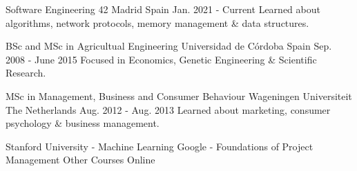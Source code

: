 
\begin{cventries}

  \cventry
    {Software Engineering} %
    {42 Madrid} %
    {Spain} %
    {Jan. 2021 - Current} %
    {
      {Learned about algorithms, network protocols, memory management \& data structures.}
    }

  \cventry
    {BSc and MSc in Agricultual Engineering} %
    {Universidad de Córdoba} %
    {Spain} %
    {Sep. 2008 - June 2015} %
    {
      {Focused in Economics, Genetic Engineering \& Scientific Research.}
    }

  \cventry
    {MSc in Management, Business and Consumer Behaviour} %
    {Wageningen Universiteit} %
    {The Netherlands} %
    {Aug. 2012 - Aug. 2013} %
    {
      {Learned about marketing, consumer psychology \& business management.}
    }

  \cventry
    {Stanford University - Machine Learning \break Google - Foundations of Project Management} %
    {Other Courses} %
    {Online} %
    {} %
    {
    }



\end{cventries}
